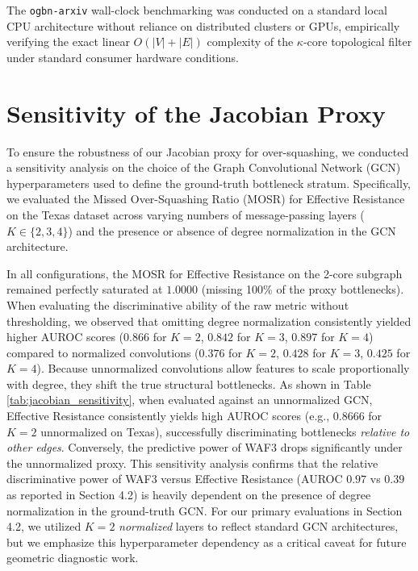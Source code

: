 \documentclass[10pt]{article} %
\begin{document}
The \texttt{ogbn-arxiv} wall-clock benchmarking was conducted on a standard local CPU architecture without reliance on distributed clusters or GPUs, empirically verifying the exact linear $O(|V| + |E|)$ complexity of the $\kappa$-core topological filter under standard consumer hardware conditions.

\section{Sensitivity of the Jacobian Proxy}
To ensure the robustness of our Jacobian proxy for over-squashing, we conducted a sensitivity analysis on the choice of the Graph Convolutional Network (GCN) hyperparameters used to define the ground-truth bottleneck stratum. Specifically, we evaluated the Missed Over-Squashing Ratio (MOSR) for Effective Resistance on the Texas dataset across varying numbers of message-passing layers ($K \in \{2, 3, 4\}$) and the presence or absence of degree normalization in the GCN architecture. 

In all configurations, the MOSR for Effective Resistance on the 2-core subgraph remained perfectly saturated at $1.0000$ (missing 100\% of the proxy bottlenecks). When evaluating the discriminative ability of the raw metric without thresholding, we observed that omitting degree normalization consistently yielded higher AUROC scores ($0.866$ for $K=2$, $0.842$ for $K=3$, $0.897$ for $K=4$) compared to normalized convolutions ($0.376$ for $K=2$, $0.428$ for $K=3$, $0.425$ for $K=4$). Because unnormalized convolutions allow features to scale proportionally with degree, they shift the true structural bottlenecks. As shown in Table \ref{tab:jacobian_sensitivity}, when evaluated against an unnormalized GCN, Effective Resistance consistently yields high AUROC scores (e.g., $0.8666$ for $K=2$ unnormalized on Texas), successfully discriminating bottlenecks \textit{relative to other edges}. Conversely, the predictive power of WAF3 drops significantly under the unnormalized proxy. This sensitivity analysis confirms that the relative discriminative power of WAF3 versus Effective Resistance (AUROC $0.97$ vs $0.39$ as reported in Section 4.2) is heavily dependent on the presence of degree normalization in the ground-truth GCN. For our primary evaluations in Section 4.2, we utilized $K=2$ \textit{normalized} layers to reflect standard GCN architectures, but we emphasize this hyperparameter dependency as a critical caveat for future geometric diagnostic work.
\end{document}
